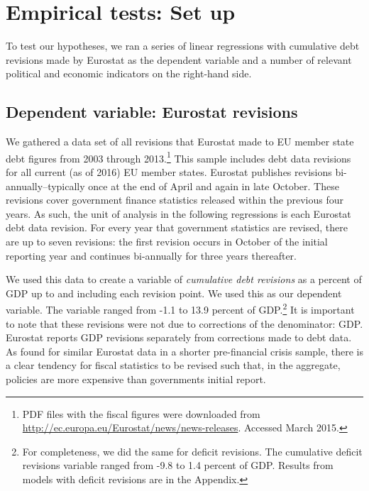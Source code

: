 \documentclass[]{article}
\begin{document}

\section{Empirical tests: Set up}

To test our hypotheses, we ran a series of linear regressions with cumulative debt revisions made by Eurostat as the dependent variable and a number of relevant political and economic indicators on the right-hand side.

\subsection{Dependent variable: Eurostat revisions}

We gathered a data set of all revisions that Eurostat made to EU member state debt figures from 2003 through 2013.\footnote{PDF files with the fiscal figures were downloaded from \url{http://ec.europa.eu/Eurostat/news/news-releases}. Accessed March 2015.} This sample includes debt data revisions for all current (as of 2016) EU member states. Eurostat publishes revisions bi-annually--typically once at the end of April and again in late October. These revisions cover government finance statistics released within the previous four years. As such, the unit of analysis in the following regressions is each Eurostat debt data revision. For every year that government statistics are revised, there are up to seven revisions: the first revision occurs in October of the initial reporting year and continues bi-annually for three years thereafter.

We used this data to create a variable of \emph{cumulative debt revisions} as a percent of GDP up to and including each revision point. We used this as our dependent variable. The variable ranged from -1.1 to 13.9 percent of GDP.\footnote{For completeness, we did the same for deficit revisions. The cumulative deficit revisions variable ranged from -9.8 to 1.4 percent of GDP. Results from models with deficit revisions are in the Appendix.} It is important to note that these revisions were not due to corrections  of the denominator: GDP. Eurostat reports GDP revisions separately from corrections made to debt data. As \cite{DeCastro2013} found for similar Eurostat data in a shorter pre-financial crisis sample, there is a clear tendency for fiscal statistics to be revised such that, in the aggregate, policies are more expensive than governments initial report.
\end{document}
